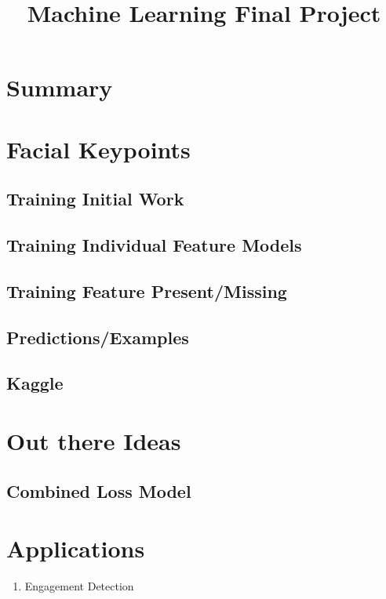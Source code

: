\documentclass[conference]{IEEEtran}
\begin{document}
\title{Machine Learning Final Project}
\author{
\and
{}
}

\maketitle

\section{Summary}

\section{Facial Keypoints}
\subsection{Training Initial Work}
\subsection{Training Individual Feature Models}
\subsection{Training Feature Present/Missing}
\subsection{Predictions/Examples}

\subsection{Kaggle}

\section{Out there Ideas}
\subsection{Combined Loss Model}
\section{Applications}
\begin{enumerate}
\item Engagement Detection
\end{enumerate}
\end{document}
